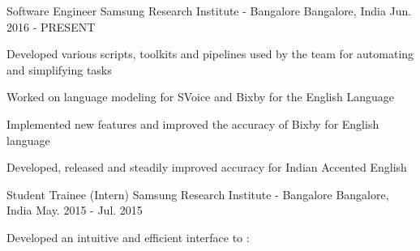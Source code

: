 

\begin{cventries}

  \cventry
    {Software Engineer} %
    {Samsung Research Institute - Bangalore} %
    {Bangalore, India} %
    {Jun. 2016 - PRESENT} %
    {
      \begin{cvitems} %
        \item {Developed various scripts, toolkits and pipelines used by the team for automating and simplifying tasks}
        \item {Worked on language modeling for SVoice and Bixby for the English Language}
        \item {Implemented new features and improved the accuracy of Bixby for English language}
        \item {Developed, released and steadily improved accuracy for Indian Accented English}
      \end{cvitems}
    }

  \cventry
    {Student Trainee (Intern)} %
    {Samsung Research Institute - Bangalore} %
    {Bangalore, India} %
    {May. 2015 - Jul. 2015} %
    {
      \begin{cvitems} %
        \item {Developed an intuitive and efficient interface to :}
      \end{cvitems}
    }


\end{cventries}
